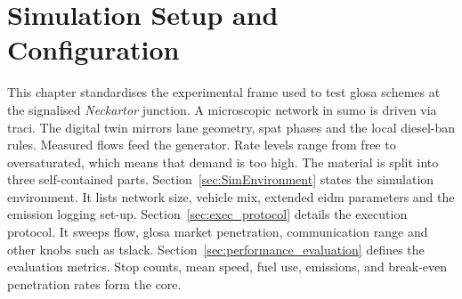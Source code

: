 \chapter{Simulation Setup and Configuration}
\label{ch:SimulationSetupConfiguration}

This chapter standardises the experimental frame used to test \ac{glosa} schemes at the signalised \emph{Neckartor} junction. A microscopic network in \ac{sumo} is driven via \ac{traci}. The digital twin mirrors lane geometry, \ac{spat} phases and the local diesel-ban rules. Measured flows feed the generator. Rate levels range from free to oversaturated, which means that demand is too high.
\mynewline
The material is split into three self-contained parts. Section~\ref{sec:SimEnvironment} states the simulation environment. It lists network size, vehicle mix, extended \ac{eidm} parameters and the emission logging set-up. Section~\ref{sec:exec_protocol} details the execution protocol. It sweeps flow, \ac{glosa} market penetration, communication range and other knobs such as \gls{tslack}. Section~\ref{sec:performance_evaluation} defines the evaluation metrics. Stop counts, mean speed, fuel use, emissions, and break-even penetration rates form the core. 





